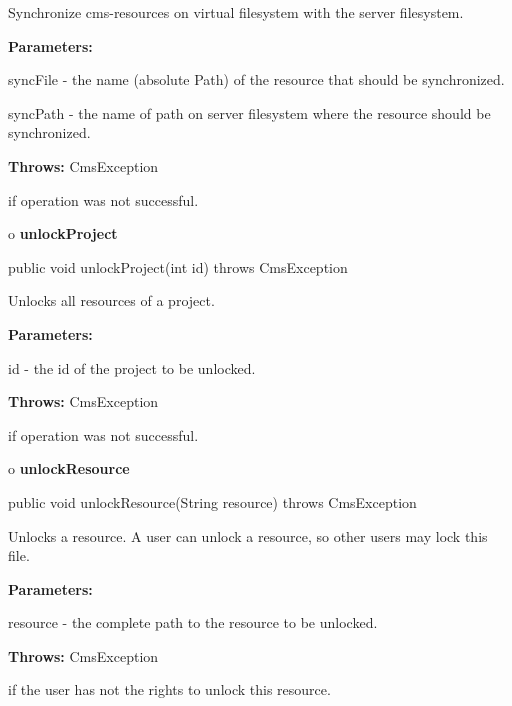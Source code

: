 \begin{description}
\htmlDD Synchronize cms-resources on virtual filesystem with the server
filesystem. 

\begin{description}
\item {\bf Parameters:}  

syncFile - the name (absolute Path) of the resource that should be
synchronized.  

syncPath - the name of path on server filesystem where the resource should be
synchronized.  
\item {\bf Throws:} CmsException  

if operation was not successful.  
\end{description}

\end{description}

o {\bf unlockProject} 

\begin{PRE}
 public void unlockProject(int id) throws CmsException
\end{PRE}

\begin{description}
\htmlDD Unlocks all resources of a project. 

\begin{description}
\item {\bf Parameters:}  

id - the id of the project to be unlocked.  
\item {\bf Throws:} CmsException  

if operation was not successful.  
\end{description}

\end{description}

o {\bf unlockResource} 

\begin{PRE}
 public void unlockResource(String resource) throws CmsException
\end{PRE}

\begin{description}
\htmlDD Unlocks a resource. \htmlBR
A user can unlock a resource, so other users may lock this file. 

\begin{description}
\item {\bf Parameters:}  

resource - the complete path to the resource to be unlocked.  
\item {\bf Throws:} CmsException  

if the user has not the rights to unlock this resource.  
\end{description}

\end{description}

